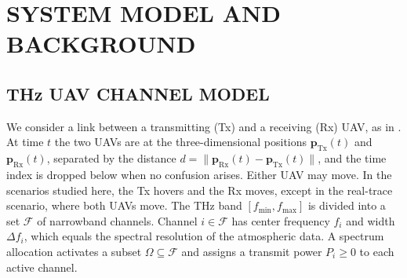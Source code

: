\documentclass{ieee-ojvt}
\begin{document}
\section{SYSTEM MODEL AND BACKGROUND}
\label{sec:system}
\subsection{THz UAV CHANNEL MODEL}
\label{sec:channel}
We consider a link between a transmitting (Tx) and a receiving (Rx) UAV, as in
\cite{10399804}. At time $t$ the two UAVs are at the three-dimensional positions
$\mathbf{p}_{\mathrm{Tx}}(t)$ and $\mathbf{p}_{\mathrm{Rx}}(t)$, separated by the distance
$d=\|\mathbf{p}_{\mathrm{Rx}}(t)-\mathbf{p}_{\mathrm{Tx}}(t)\|$, and the time index is
dropped below when no confusion arises. Either UAV may move. In the scenarios studied
here, the Tx hovers and the Rx moves, except in the real-trace scenario, where both UAVs
move. The THz band $[f_{\min},f_{\max}]$ is divided into a set $\mathcal{F}$ of narrowband
channels. Channel $i\in\mathcal{F}$ has center frequency $f_i$ and width $\Delta f_i$,
which equals the spectral resolution of the atmospheric data. A spectrum allocation
activates a subset $\Omega\subseteq\mathcal{F}$ and assigns a transmit power $P_i\ge0$ to
each active channel.
\end{document}
